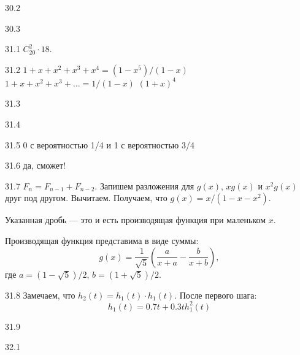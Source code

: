 \begin{solution}{{30.2}}
  
\end{solution}
\protect \hypertarget {soln:30.3}{}
\begin{solution}{{30.3}}
  
\end{solution}
\protect \hypertarget {soln:31.1}{}
\begin{solution}{{31.1}}
$C_{20}^2\cdot 18$.
\end{solution}
\protect \hypertarget {soln:31.2}{}
\begin{solution}{{31.2}}
  $1+x+x^2+x^3+x^4=(1-x^5)/(1-x)$
  $1+x+x^2+x^3+\ldots = 1/(1-x)$
  $(1+x)^4$
\end{solution}
\protect \hypertarget {soln:31.3}{}
\begin{solution}{{31.3}}
\end{solution}
\protect \hypertarget {soln:31.4}{}
\begin{solution}{{31.4}}
\end{solution}
\protect \hypertarget {soln:31.5}{}
\begin{solution}{{31.5}}
  0 с вероятностью 1/4 и 1 с вероятностью 3/4
\end{solution}
\protect \hypertarget {soln:31.6}{}
\begin{solution}{{31.6}}
  да, сможет!
\end{solution}
\protect \hypertarget {soln:31.7}{}
\begin{solution}{{31.7}}
$F_n = F_{n-1} + F_{n-2}$.
Запишем разложения для $g(x)$, $xg(x)$ и $x^2 g(x)$ друг под другом. Вычитаем. Получаем, что $g(x) = x/(1-x-x^2)$.

Указанная дробь — это и есть производящая функция при маленьком $x$.

Производящая функция представима в виде суммы:
\[
g(x) = \frac{1}{\sqrt{5}}\left( \frac{a}{x+a} - \frac{b}{x+b}  \right),
\]
где $a=(1-\sqrt{5})/2$, $b=(1+\sqrt{5})/2$.
\end{solution}
\protect \hypertarget {soln:31.8}{}
\begin{solution}{{31.8}}
Замечаем, что $h_2(t)=h_1(t)\cdot h_1(t)$. После первого шага:
\[
h_1(t) = 0.7t + 0.3th^2_1(t)
\]
\end{solution}
\protect \hypertarget {soln:31.9}{}
\begin{solution}{{31.9}}

\end{solution}
\protect \hypertarget {soln:32.1}{}
\begin{solution}{{32.1}}
\end{solution}
